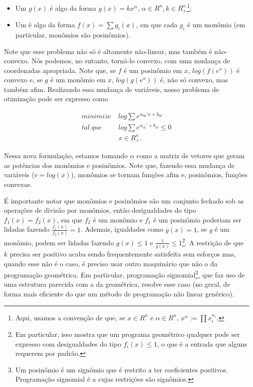 \documentclass{article}
\begin{document}
\begin{itemize}
\item Um  $g(x)$ é algo da forma $g(x) =
  kx^{\alpha}$, $\alpha \in R^n, k \in R^n_{+}$\footnote{Aqui, usamos
    a convenção de que, se $x \in R^n$ e $\alpha \in R^n$, $x^{\alpha}
    := \prod x_i^{\alpha_i}$.};
\item Um  é algo da forma $f(x) = \sum g_i(x)$,
  em que cada $g_i$ é um monômio (em particular, monômios são
  posinômios).
\end{itemize}

Note que esse problema não só é altamente não-linear, mas também é
não-convexo. Nós podemos, no entanto, torná-lo convexo, com uma
mudança de coordenadas apropriada. Note que, se $f$ é um posinômio em
$x$, $log(f(e^x))$ é convexo e, se $g$ é um monômio em $x$,
$log(g(e^x))$ é, não só convexo, mas também afim. Realizando essa
mudança de variáveis, nosso problema de otimização pode ser expresso
como

\begin{align*}
  minimize \;& log \sum e^{\alpha_{0k}'x + b_{0k}}\\ tal\; que\;& log
  \sum e^{\alpha_{ik}' + b_{ik}} \leq 0\\ & x \in R^n_{+}.
\end{align*}

Nessa nova formulação, estamos tomando $\alpha$ como a matriz de
vetores que geram as potências dos monômios e posinômios. Note que,
fazendo essa mudança de variáveis ($v = log(x)$), monômios se tornam
funções afim e, posinômios, funções convexas.

É importante notar que monômios e posinômios são um conjunto fechado
sob as operações de divisão por monômios, então desigualdades do tipo
$f_1(x) = f_2(x)$, em que $f_2$ é um monômio e $f_1$ é um posinômio
poderiam ser lidadas fazendo $\frac{f_1(x)}{f_2(x)} = 1$. Ademais,
igualdades como $g(x) = 1$, se $g$ é um monômio, podem ser lidadas
fazendo $g(x) \leq 1$ e $\frac{1}{g(x)} \leq 1$\footnote{Em
  particular, isso mostra que um programa geométrico qualquer pode ser
  expresso com desigualdades do tipo $f_i(x) \leq 1$, o que é a
  entrada que alguns  requerem por padrão.}. A
restrição de que $k$ precisa ser positivo acaba sendo frequentemente
satisfeita sem esforços mas, quando esse não é o caso, é preciso
usar outro maquinário que não o da programação geométrica. Em
particular, programação signomial\footnote{Um posinômio é um signômio
  que é restrito a ter coeficientes positivos. Programação signomial é
  a cujas restrições são signômios.}, que faz uso de uma estrutura
parecida com a da geométrica, resolve esse caso (no geral, de forma
mais eficiente do que um método de programação não linear
genérico).
\end{document}
